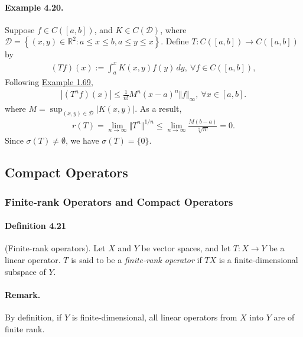 \documentclass{article}
\begin{document}
\paragraph{Example 4.20.\label{example:4.20}} Suppose $f\in C([a,b])$, and $K\in C(\mathcal{D})$, where $\mathcal{D}=\left\{(x,y)\in\mathbb{R}^2: a\leq x\leq b, a\leq y\leq x\right\}$. Define $T:C([a,b])\to C([a,b])$ by
\begin{align*}
	(Tf)(x):=\int_a^x K(x,y)f(y)\,dy,\ \forall f\in C([a,b]),
\end{align*}
Following \hyperref[example:1.69]{Example 1.69},
\begin{align*}
	\left\vert(T^n f)(x)\right\vert \leq \frac{1}{n!}M^n(x-a)^n\Vert f\Vert_\infty,\ \forall x\in[a,b].
\end{align*}
where $M=\sup_{(x,y)\in\mathcal{D}}\vert K(x,y)\vert$. As a result,
\begin{align*}
	r(T) = \lim_{n\to\infty}\Vert T^n\Vert^{1/n} \leq \lim_{n\to\infty}\frac{M(b-a)}{\sqrt[n]{n!}} = 0.
\end{align*}
Since $\sigma(T)\neq\emptyset$, we have $\sigma(T)=\{0\}$.
\newpage

\subsection{Compact Operators}
\subsubsection{Finite-rank Operators and Compact Operators}
\paragraph{Definition 4.21\label{def:4.21}} (Finite-rank operators). Let $X$ and $Y$ be vector spaces, and let $T:X\to Y$ be a linear operator. $T$ is said to be a \textit{finite-rank operator} if $TX$ is a finite-dimensional subspace of $Y$.

\paragraph{Remark.} By definition, if $Y$ is finite-dimensional, all linear operators from $X$ into $Y$ are of finite rank.
\end{document}
